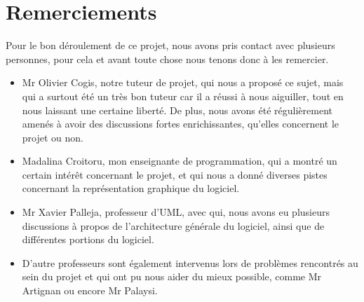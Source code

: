 \documentclass[11pt,a4paper]{article}
\title{\hbox{
	\mbox{\hspace{1em}}
		\vrule depth 0.6\textheight
		\mbox{\hspace{2em}}
		\vbox{
			\vspace{3.3cm}
			\begin{flushleft}
				\Large ESTEBE Anthony\\
			\end{flushleft}
			\vspace{1cm}
			\begin{flushleft}
				\huge \textbf{Logiciel pédagogique pour la \\compréhension d'algorithmes de graphes}
			\end{flushleft}
			\hrule
			\vspace{0.2cm}
			\Large supervisé par Mr Olivier Cogis
		}
	}
	\thispagestyle{empty}
}
\author{}
\date{}
\begin{document}
	\maketitle
	
	\thispagestyle{empty}
	
	\newpage
	\setcounter{page}{1}	
	\section*{Remerciements}
		Pour le bon déroulement de ce projet, nous avons pris contact avec plusieurs personnes, pour cela et avant toute chose nous tenons donc à les remercier.
		\begin{itemize}
			\item Mr Olivier Cogis, notre tuteur de projet, qui nous a proposé ce sujet, mais qui a surtout été un très bon tuteur car il a réussi à nous aiguiller, tout en nous laissant une certaine liberté. De plus, nous avons été régulièrement amenés à avoir des discussions fortes enrichissantes, qu'elles concernent le projet ou non.
			\item Madalina Croitoru, mon enseignante de programmation, qui a montré un certain intérêt concernant le projet, et qui nous a donné diverses pistes concernant la représentation graphique du logiciel.
			\item Mr Xavier Palleja, professeur d'UML, avec qui, nous avons eu plusieurs discussions à propos de l'architecture générale du logiciel, ainsi que de différentes portions du logiciel.
			\item D'autre professeurs sont également intervenus lors de problèmes rencontrés au sein du projet et qui ont pu nous aider du mieux possible, comme Mr Artignan ou encore Mr Palaysi.
		\end{itemize}
	
	\newpage
	\large\tableofcontents
	\normalsize
	\newpage
	\listoffigures
	
	\newpage
\end{document}
